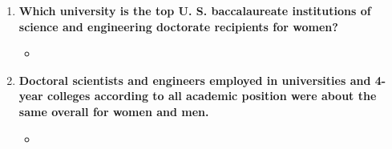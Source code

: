 \documentclass[12pt,a4paper]{article}
\begin{document}
\begin{enumerate}
\begin{itemize}
      \item {}
    \end{itemize}
    \item \textbf{Which university is the top U. S. baccalaureate institutions of science and engineering doctorate recipients for women?}
    \begin{itemize}
      \item {}
    \end{itemize}
    \item \textbf{Doctoral scientists and engineers employed in universities and 4-year colleges according to all academic position were about the same overall for women and men.}
    \begin{itemize}
      \item {}
    \end{itemize}
  \end{enumerate}
\end{document}
